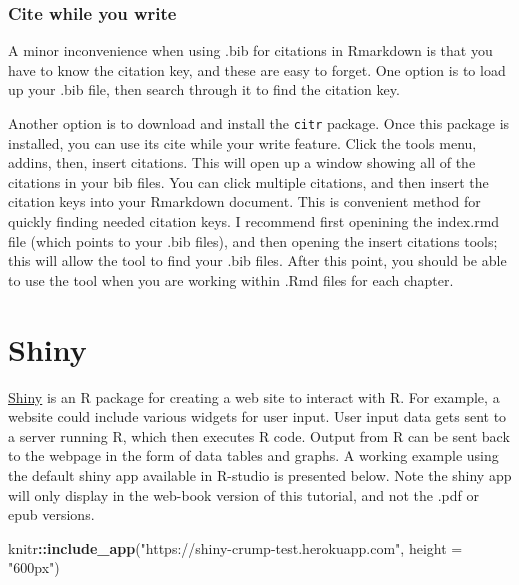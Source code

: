 \documentclass[
]{book}
\newenvironment{Shaded}{\begin{snugshade}}{\end{snugshade}}
\newcommand{\AttributeTok}[1]{\textcolor[rgb]{0.13,0.29,0.53}{#1}}
\newcommand{\FunctionTok}[1]{\textcolor[rgb]{0.13,0.29,0.53}{\textbf{#1}}}
\newcommand{\NormalTok}[1]{#1}
\newcommand{\SpecialCharTok}[1]{\textcolor[rgb]{0.81,0.36,0.00}{\textbf{#1}}}
\newcommand{\StringTok}[1]{\textcolor[rgb]{0.31,0.60,0.02}{#1}}
\begin{document}
\hypertarget{cite-while-you-write}{%
\subsection{Cite while you write}\label{cite-while-you-write}}

A minor inconvenience when using .bib for citations in Rmarkdown is that you have to know the citation key, and these are easy to forget. One option is to load up your .bib file, then search through it to find the citation key.

Another option is to download and install the \texttt{citr} package. Once this package is installed, you can use its cite while your write feature. Click the tools menu, addins, then, insert citations. This will open up a window showing all of the citations in your bib files. You can click multiple citations, and then insert the citation keys into your Rmarkdown document. This is convenient method for quickly finding needed citation keys. I recommend first openining the index.rmd file (which points to your .bib files), and then opening the insert citations tools; this will allow the tool to find your .bib files. After this point, you should be able to use the tool when you are working within .Rmd files for each chapter.

\hypertarget{shiny}{%
\chapter{Shiny}\label{shiny}}

\href{https://shiny.rstudio.com}{Shiny} is an R package for creating a web site to interact with R. For example, a website could include various widgets for user input. User input data gets sent to a server running R, which then executes R code. Output from R can be sent back to the webpage in the form of data tables and graphs. A working example using the default shiny app available in R-studio is presented below. Note the shiny app will only display in the web-book version of this tutorial, and not the .pdf or epub versions.

\begin{Shaded}
\begin{Highlighting}[]
\NormalTok{knitr}\SpecialCharTok{::}\FunctionTok{include\_app}\NormalTok{(}\StringTok{"https://shiny{-}crump{-}test.herokuapp.com"}\NormalTok{, }
  \AttributeTok{height =} \StringTok{"600px"}\NormalTok{)}
\end{Highlighting}
\end{Shaded}
\end{document}
